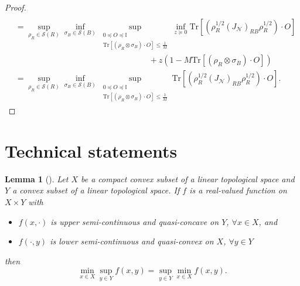 \documentclass[a4paper,onecolumn,11pt,accepted=2025-10-01]{quantumarticle}
\newtheorem{lem}[theorem]{Lemma}
\newcommand*{\dI}{\mathbb{I}}
\newcommand*{\cN}{\mathcal{N}}
\newcommand*{\cS}{\mathcal{S}}
\newcommand*{\tr}[1]{\mathrm{Tr}\left[#1\right]}
\newcommand*{\mge}{\succcurlyeq}
\newcommand*{\mle}{\preccurlyeq}
\begin{document}
\begin{proof}
\begin{align}
     \\& =\sup_{\rho_R\in \cS(R)}\inf_{\sigma_B \in \cS(B)}\sup_{\substack{0\mle O\mle \dI \\ \tr{(\rho_R\otimes \sigma_B)\cdot O}\le \frac{1}{M}}} \inf_{z\mge 0}\tr{(\rho_R^{1/2} ( J_{\cN})_{RB}\rho_R^{1/2})\cdot O }
       \\&\qquad\qquad\qquad\qquad\qquad\qquad\qquad\qquad\;  +z\left(1- M\tr{(\rho_R\otimes \sigma_B)\cdot O}\right)
       \\&=\sup_{\rho_R\in \cS(R)}\inf_{\sigma_B \in \cS(B)}\sup_{\substack{0\mle O\mle \dI \\ \tr{(\rho_R\otimes \sigma_B)\cdot O}\le \frac{1}{M}}} \tr{(\rho_R^{1/2} ( J_{\cN})_{RB}\rho_R^{1/2})\cdot O }.
\end{align}
\end{proof}


\section{Technical statements}

\begin{lem}[\cite{sion1958general}]\label{lem-Sion}
    Let $X$ be a compact convex subset of a linear topological space and $Y$ a convex subset of a linear topological space. If $f$  is a real-valued function on $X \times Y$ with
    \begin{itemize}
        \item $f(x, \cdot)$ is upper semi-continuous and quasi-concave on $Y$, $ \forall x\in X $, and
        \item $f(\cdot,y)$ is lower semi-continuous and quasi-convex on $X$, $ \forall y\in Y $
    \end{itemize}
    then
\begin{equation}
    \min_{x\in X} \sup_{y\in Y} f(x,y) =  \sup_{y\in Y} \min_{x\in X}f(x,y).
\end{equation}
\end{lem}
\end{document}
